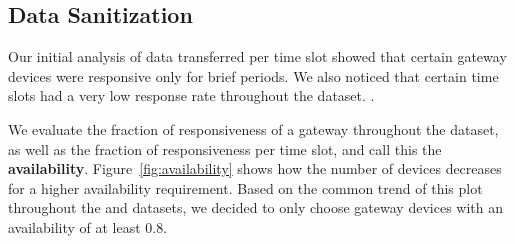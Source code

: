 


\subsection{Data Sanitization}

Our initial analysis of data transferred per time slot showed that certain gateway devices were responsive only for brief periods. We also noticed that certain time slots had a very low response rate throughout the dataset. .

We evaluate the fraction of responsiveness of a gateway throughout the dataset, as well as the fraction of responsiveness per time slot, and call this the \textbf{availability}. Figure~\ref{fig:availability} shows how the number of devices decreases for a higher availability requirement. Based on the common trend of this plot throughout the \test and \control datasets, we decided to only choose gateway devices with an availability of at least 0.8. %



